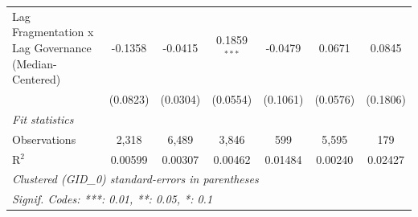 \begin{table}[H]
\begin{tabular}{lcccccc}
      Lag Fragmentation x Lag Governance (Median-Centered) & -0.1358  & -0.0415        & 0.1859$^{***}$ & -0.0479        & 0.0671         & 0.0845\\   
                                                           & (0.0823) & (0.0304)       & (0.0554)       & (0.1061)       & (0.0576)       & (0.1806)\\   
      \midrule
      \emph{Fit statistics}\\
      Observations                                         & 2,318    & 6,489          & 3,846          & 599            & 5,595          & 179\\  
      R$^2$                                                & 0.00599  & 0.00307        & 0.00462        & 0.01484        & 0.00240        & 0.02427\\  
      \midrule \midrule
      \multicolumn{7}{l}{\emph{Clustered (GID\_0) standard-errors in parentheses}}\\
      \multicolumn{7}{l}{\emph{Signif. Codes: ***: 0.01, **: 0.05, *: 0.1}}\\
   \end{tabular}
\end{table}


